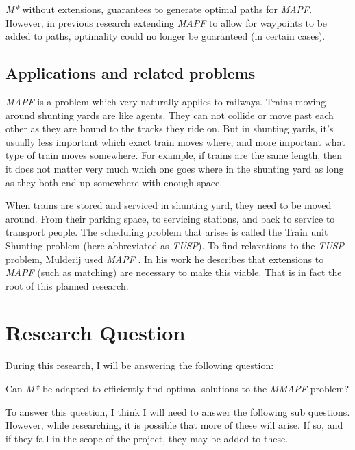 \documentclass[english]{article}
\begin{document}
\textit{M*} without extensions, guarantees to generate optimal paths for \textit{MAPF}. However, in previous research extending \textit{MAPF} to allow for waypoints to be added to  paths, optimality could no longer be guaranteed (in certain cases). \cite{MSTAR_waypoints_van_dijk_2020}

\subsection{Applications and related problems}

\textit{MAPF} is a problem which very naturally applies to railways. Trains moving around shunting yards are like agents. They can not collide or move past each other as they are bound to the tracks they ride on. But in shunting yards, it's usually less important which exact train moves where, and more important what type of train moves somewhere. For example, if trains are the same length, then it does not matter very much which one goes where in the shunting yard as long as they both end up somewhere with enough space. 

When trains are stored and serviced in shunting yard, they need to be moved around. From their parking space, to servicing stations, and back to service to transport people. The scheduling problem that arises is called the Train unit Shunting problem (here abbreviated as \textit{TUSP}). To find relaxations to the \textit{TUSP} problem, Mulderij used \textit{MAPF} \cite{TUSS_MAPF_mulderij_2020}. In his work he describes that extensions to \textit{MAPF} (such as matching) are necessary to make this viable. That is in fact the root of this planned research.


\section*{Research Question}

During this research, I will be answering the following question:

\begin{displayquote}
    Can \textit{M*} be adapted to efficiently find optimal solutions to the \textit{MMAPF} problem?
\end{displayquote}

To answer this question, I think I will need to answer the following sub questions. However, while researching, it is possible that more of these will arise. If so, and if they fall in the scope of the project, they may be added to these.
\end{document}

